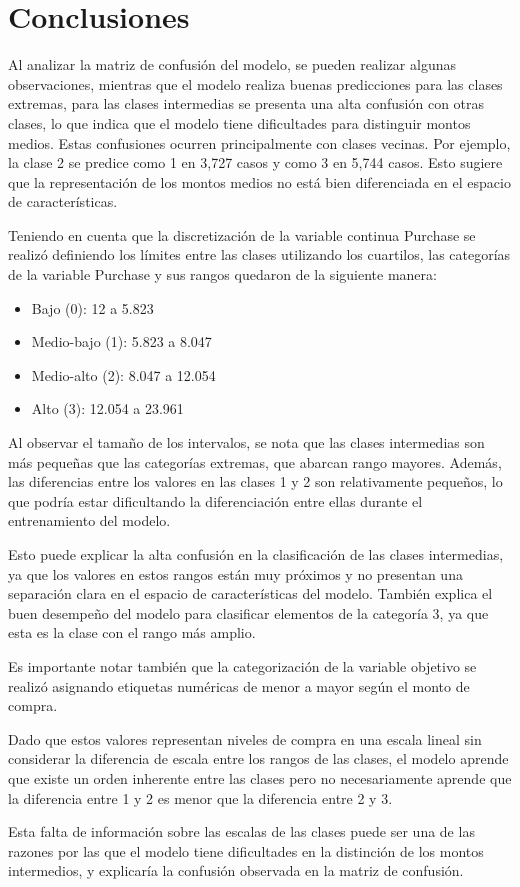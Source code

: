 \documentclass[12pt]{article}
\begin{document}
\section{Conclusiones}
Al analizar la matriz de confusión del modelo, se pueden realizar algunas observaciones, 
mientras que el modelo realiza buenas predicciones para las clases extremas, para las clases intermedias 
se presenta una alta confusión con otras clases, lo que indica que el modelo tiene dificultades
para distinguir montos medios. Estas confusiones ocurren principalmente con 
clases vecinas. Por ejemplo, la clase 2 se predice como 1 en 3,727 casos y como 3 en 5,744 casos. Esto sugiere que la representación 
de los montos medios no está bien diferenciada en el espacio de características. 

Teniendo en cuenta que la discretización de la variable continua Purchase se realizó definiendo los 
límites entre las clases utilizando los cuartilos, las categorías de la variable Purchase y sus rangos quedaron de la siguiente manera:

\begin{itemize}
    \item Bajo (0): 12 a 5.823
    \item Medio-bajo (1): 5.823 a 8.047
    \item Medio-alto (2): 8.047 a 12.054
    \item Alto (3): 12.054 a 23.961
\end{itemize}

Al observar el tamaño de los intervalos, se nota que las clases intermedias son más pequeñas 
que las categorías extremas, que abarcan rango mayores. Además, las diferencias entre los 
valores en las clases 1 y 2 son relativamente pequeños, lo que podría estar dificultando la diferenciación 
entre ellas durante el entrenamiento del modelo.

Esto puede explicar la alta confusión en la clasificación de las clases intermedias, ya que los valores en estos rangos están muy próximos y no presentan una separación clara en el espacio de 
características del modelo. También explica el buen desempeño del modelo para clasificar elementos de 
la categoría 3, ya que esta es la clase con el rango más amplio.

Es importante notar también que la categorización de la variable objetivo se realizó
asignando etiquetas numéricas de menor a mayor según el monto de compra.

Dado que estos valores representan niveles de compra en una escala lineal sin considerar la diferencia de escala entre los rangos de las clases, el modelo aprende que existe un 
orden inherente entre las clases pero no necesariamente aprende que la 
diferencia entre 1 y 2 es menor que la diferencia entre 2 y 3.

Esta falta de información sobre las escalas de las clases puede ser una de las razones por las que el 
modelo tiene dificultades en la distinción de los montos intermedios, y explicaría la confusión observada en la matriz de confusión.
\end{document}
